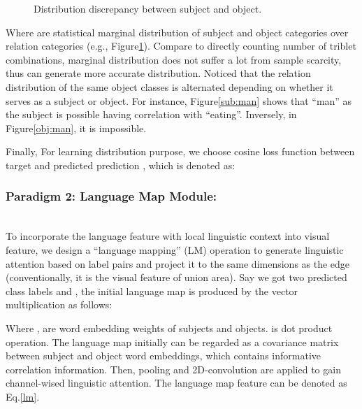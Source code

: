 \documentclass[runningheads]{llncs}
\begin{document}
\begin{figure}[tbp!]
  \centering
  \begin{minipage}[t]{0.48\textwidth}
    \centering
    \qquad
  \end{minipage}
  \begin{minipage}[t]{0.48\textwidth}
    \centering
  \end{minipage}
  \caption{Distribution discrepancy between subject and object.}
  \label{fig:Distribution Discrepancy}
\end{figure}
Where  are statistical  marginal
distribution  of subject and object categories over relation categories (e.g.,
Figure\ref{fig:Distribution Discrepancy}). Compare to directly counting
 number of triblet combinations, marginal distribution does not
suffer a lot from sample scarcity, thus can generate more accurate
distribution. Noticed that the relation distribution of the same object classes
is alternated depending on whether it serves as a subject or object.
For instance, Figure\ref{sub:man} shows that ``man'' as the subject is possible
having correlation with ``eating''. Inversely, in Figure\ref{obj:man}, it is
impossible.

Finally,  For learning distribution purpose, we choose cosine loss function
between target  and predicted prediction , which is
denoted as:




\subsubsection{Paradigm 2: Language Map  Module:}~\\

To incorporate	the language feature with local linguistic context into visual
feature, we design a ``language mapping'' (LM) operation to generate linguistic
attention based on label pairs  and project it to the same
dimensions as the edge (conventionally, it is the visual feature of union
area). Say we got two predicted class labels  and ,
the initial language map  is produced by the vector multiplication as
follows:

Where ,  are word embedding
weights of subjects and objects.  is dot product operation.
The language map initially can be regarded as a covariance matrix between
subject and object word embeddings, which contains informative correlation
information.
Then, pooling and 2D-convolution are applied to gain channel-wised linguistic
attention. The language map feature 
can be denoted as  Eq.\ref{lm}.
\end{document}

